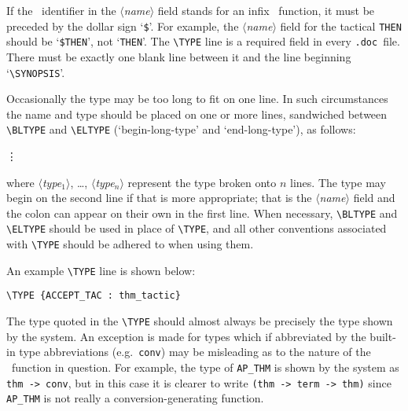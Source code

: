 \documentclass[12pt]{article}
\def\doc{{\tt .doc}}
\def\vsp{{\tt\char`\ }}
\def\meta#1{\(\langle\){\it #1}\(\rangle\)}
\begin{document}
\noindent If the \ML\ identifier in the \meta{name} field stands for an infix
\ML\ function, it must be preceded by the dollar sign `{\small\verb!$!}'.  For
example, the \meta{name} field for the tactical {\small\verb!THEN!} should be
`{\small\verb!$THEN!}', not `{\small\verb!THEN!}'.  The {\small\verb!\TYPE!}
line is  a required field in every \doc\ file.  There must be exactly one
blank line between it and the line beginning `{\small\verb!\SYNOPSIS!}'.

Occasionally the type may be too long to fit on one line. In such circumstances
the name and type should be placed on one or more lines, sandwiched between
{\small\verb!\BLTYPE!} and {\small\verb!\ELTYPE!} (`begin-long-type' and
`end-long-type'), as follows:

\medskip
\noindent\qquad{\small\verb!\BLTYPE!}
\par\noindent\qquad{\small\meta{name}\vsp\ml{:}\vsp\meta{type$_1$}}
\par\noindent\qquad{\small\meta{type$_2$}}
\par\noindent\qquad\vdots
\par\noindent\qquad{\small\meta{type$_n$}}
\par\noindent\qquad{\small\verb!\ELTYPE!}
\medskip

\noindent
where \meta{type$_1$}, \ldots, \meta{type$_n$} represent the type broken onto
$n$ lines. The type may begin on the second line if that is more appropriate;
that is the \meta{name} field and the colon can appear on their own in the
first line. When necessary, {\small\verb!\BLTYPE!} and {\small\verb!\ELTYPE!}
should be used in place of {\small\verb!\TYPE!}, and all other conventions
associated with {\small\verb!\TYPE!} should be adhered to when using them.

An example {\small\verb!\TYPE!} line is shown below:

\smallskip

\begin{holboxed}\begin{verbatim}
\TYPE {ACCEPT_TAC : thm_tactic}
\end{verbatim}\end{holboxed}

\smallskip

The type quoted in the {\small\verb!\TYPE!} should almost always be precisely
the type shown by the system.  An exception is made for types which if
abbreviated by the built-in type abbreviations (e.g.\ {\small\verb!conv!}) may
be misleading as to the nature of the \ML\ function in question.  For example,
the type of {\small\verb!AP_THM!} is shown by the system as
{\small\verb!thm -> conv!}, but in this case it is clearer to write
{\small\verb!(thm -> term -> thm)!} since {\small\verb!AP_THM!} is not really a
conversion-generating function.
\end{document}
